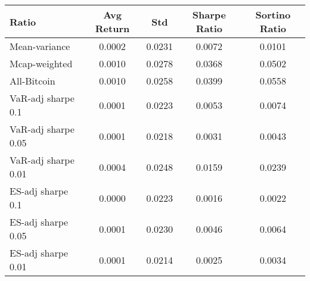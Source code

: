 \begin{tabular}{lcccc}
\toprule
Ratio & Avg Return & Std & Sharpe Ratio & Sortino Ratio\\
\midrule
Mean-variance & 0.0002 & 0.0231 & 0.0072 & 0.0101\\
Mcap-weighted & 0.0010 & 0.0278 & 0.0368 & 0.0502\\
All-Bitcoin & 0.0010 & 0.0258 & 0.0399 & 0.0558\\
VaR-adj sharpe 0.1 & 0.0001 & 0.0223 & 0.0053 & 0.0074\\
VaR-adj sharpe 0.05 & 0.0001 & 0.0218 & 0.0031 & 0.0043\\
VaR-adj sharpe 0.01 & 0.0004 & 0.0248 & 0.0159 & 0.0239\\
ES-adj sharpe 0.1 & 0.0000 & 0.0223 & 0.0016 & 0.0022\\
ES-adj sharpe 0.05 & 0.0001 & 0.0230 & 0.0046 & 0.0064\\
ES-adj sharpe 0.01 & 0.0001 & 0.0214 & 0.0025 & 0.0034\\
\bottomrule
\end{tabular}
